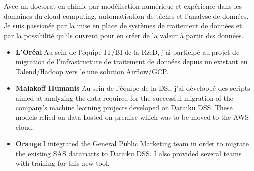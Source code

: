 \documentclass[10pt,a4paper,ragged2e,academicons]{altacv}
\begin{document}

\begin{fullwidth}
\makecvheader
\parbox{.7\paperwidth}{%
Avec un doctorat en chimie par modélisation numérique et expérience dans les domaines du cloud computing, automatisation de tâches et l'analyse de données. Je suis passionée par la mise en place de systèmes de traitement de données et par la possibilité qu'ils ouvrent pour en créer de la valeur à partir des données.
}

\end{fullwidth}



\begin{itemize}
\item \textbf{L’Oréal} Au sein de l’équipe IT/BI de la R\&D, j'ai participé au projet de migration de l’infrastructure de traitement de données depuis un existant en Talend/Hadoop vers le une solution Airflow/GCP.
\end{itemize}

\divider

\begin{itemize}
\item \textbf{Malakoff Humanis} Au sein de l’équipe de la DSI, j'ai  développé des scripts aimed at analyzing the data required for the successful migration of the company's machine learning projects developed on Dataiku DSS. These models relied on data hosted on-premise which was to be moved to the AWS cloud. 
\item \textbf{Orange} I integrated the General Public Marketing team in order to migrate the existing SAS datamarts to Dataiku DSS. I also provided several teams with training for this new tool. 
\end{itemize}
\end{document}
